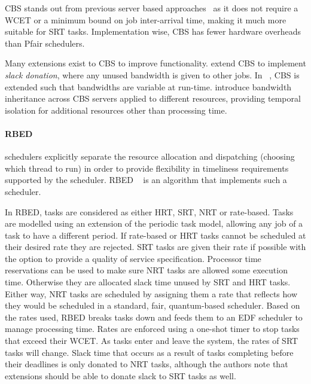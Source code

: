 \gls{CBS} stands out from previous server based approaches~\citep{Spuri_Buttazzo_1996, Ghazalie_B_1995, Spuri_Buttazzo_1994, Deng_Liu_1997} as it does not require a \gls{WCET} or a minimum bound on job inter-arrival time, making it much more suitable for \gls{SRT} tasks.
Implementation wise, \gls{CBS} has fewer hardware overheads than Pfair schedulers.

Many extensions exist to \gls{CBS} to improve functionality.
\citet{Kato_IR_2011} extend \gls{CBS} to implement \emph{slack donation}, where any unused bandwidth is given to other jobs.
In ~\citep{Craciunas_KPRS_2012}, \gls{CBS} is extended such that bandwidths are variable at run-time.
\citet{Lamastra_LA_01} introduce bandwidth inheritance across CBS servers applied to different resources, providing temporal isolation for additional resources other than processing time.

\paragraph{\gls{RBED}} schedulers explicitly separate the resource allocation and dispatching (choosing which thread to run) in order to provide flexibility in timeliness requirements supported by the scheduler.
  \Gls{RBED} ~\citep{Brandt_BLB_03} is an algorithm that implements such a scheduler.

In \gls{RBED}, tasks are considered as either \gls{HRT}, \gls{SRT}, \gls{NRT} or rate-based.
Tasks are modelled using an extension of the periodic task model, allowing any job of a task to have a different period.
If rate-based or \gls{HRT} tasks cannot be scheduled at their desired rate they are rejected.
\gls{SRT} tasks are given their rate if possible with the option to provide a quality of service specification.
Processor time reservations can be used to make sure \gls{NRT} tasks are allowed some execution time.
Otherwise they are allocated slack time unused by SRT and HRT tasks.
Either way, \gls{NRT} tasks are scheduled by assigning them a rate that reflects how they would be scheduled in a standard, fair, quantum-based scheduler.
Based on the rates used, \gls{RBED} breaks tasks down and feeds them to an \gls{EDF} scheduler to manage processing time.
Rates are enforced using a one-shot timer to stop tasks that exceed their {\gls{WCET}}.
As tasks enter and leave the system, the rates of \gls{SRT} tasks will change.
Slack time that occurs as a result of tasks completing before their deadlines is only donated to \gls{NRT} tasks, although the authors note that extensions should be able to donate slack to \gls{SRT} tasks as well.

